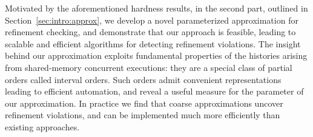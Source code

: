 Motivated by the aforementioned hardness results, in the second part, outlined
in Section~\ref{sec:intro:approx}, we develop a novel parameterized
approximation for refinement checking, and demonstrate that our approach is
feasible, leading to scalable and efficient algorithms for detecting refinement
violations. The insight behind our approximation exploits fundamental
properties of the histories arising from shared-memory concurrent executions:
they are a special class of partial orders called interval orders. Such orders
admit convenient representations leading to efficient automation, and reveal a
useful measure for the parameter of our approximation. In practice we find that
coarse approximations uncover refinement violations, and can be implemented
much more efficiently than existing approaches.



